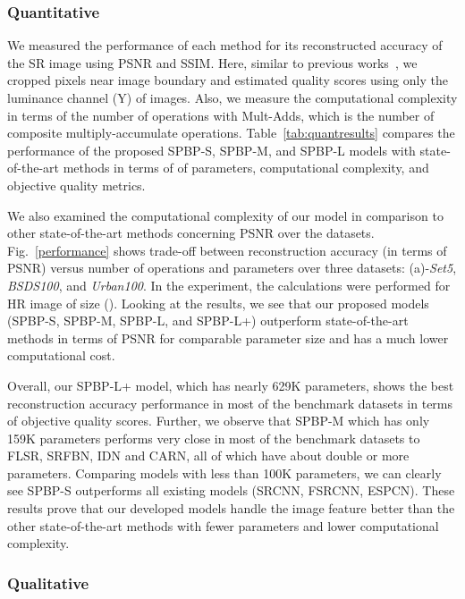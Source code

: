\documentclass[a4paper,11pt]{article}
\begin{document}
\subsubsection{Quantitative}


We measured the performance of each method for its reconstructed accuracy of the SR image using PSNR and SSIM. Here, similar to previous works~\cite{EDSR, VDSR}, we cropped  pixels near image boundary and estimated quality scores using only the luminance channel (Y) of images. Also, we measure the computational complexity in terms of the number of operations with Mult-Adds, which is the number of composite multiply-accumulate operations. Table~\ref{tab:quantresults} compares the performance of the proposed SPBP-S, SPBP-M, and SPBP-L models with state-of-the-art methods in terms of  of parameters, computational complexity, and objective quality metrics.

We also examined the computational complexity of our model in comparison to other state-of-the-art methods concerning PSNR over the datasets. Fig.~\ref{performance} shows trade-off between reconstruction accuracy (in terms of PSNR) versus number of operations and parameters over three datasets: (a)-\textit{Set5}, \textit{BSDS100}, and \textit{Urban100}. In the experiment, the calculations were performed for HR image of size  (). Looking at the results, we see that our proposed models (SPBP-S, SPBP-M, SPBP-L, and SPBP-L+) outperform state-of-the-art methods in terms of PSNR for comparable parameter size and has a much lower computational cost.

Overall, our SPBP-L+ model, which has nearly 629K parameters, shows the best reconstruction accuracy performance in most of the benchmark datasets in terms of objective quality scores. Further, we observe that SPBP-M which has only 159K parameters performs very close in most of the benchmark datasets to FLSR, SRFBN, IDN and CARN, all of which have about double or more parameters. Comparing models with less than 100K parameters, we can clearly see SPBP-S outperforms all existing models (SRCNN, FSRCNN, ESPCN). These results prove that our developed models handle the image feature better than the other state-of-the-art methods with fewer parameters and lower computational complexity.\\

\subsubsection{Qualitative}
\end{document}
